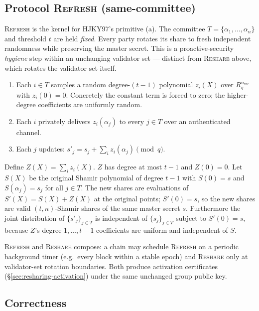 \subsection{Protocol \textsc{Refresh} (same-committee)}
\label{sec:resharing-refresh}

\textsc{Refresh} is the kernel for HJKY97's primitive (a). The committee $T = \{\alpha_1, \dots, \alpha_n\}$ and threshold $t$ are held \emph{fixed}. Every party rotates its share to fresh independent randomness while preserving the master secret. This is a proactive-security \emph{hygiene} step within an unchanging validator set --- distinct from \textsc{Reshare} above, which rotates the validator set itself.

\begin{enumerate}
\item Each $i \in T$ samples a random degree-$(t-1)$ polynomial $z_i(X)$ over $R_q^{n_{\textrm{vec}}}$ with $z_i(0) = 0$. Concretely the constant term is forced to zero; the higher-degree coefficients are uniformly random.
\item Each $i$ privately delivers $z_i(\alpha_j)$ to every $j \in T$ over an authenticated channel.
\item Each $j$ updates: $s'_j = s_j + \sum_i z_i(\alpha_j) \pmod q$.
\end{enumerate}

\begin{theorem}
Define $Z(X) = \sum_i z_i(X)$. $Z$ has degree at most $t-1$ and $Z(0) = 0$. Let $S(X)$ be the original Shamir polynomial of degree $t-1$ with $S(0) = s$ and $S(\alpha_j) = s_j$ for all $j \in T$. The new shares are evaluations of $S'(X) = S(X) + Z(X)$ at the original points; $S'(0) = s$, so the new shares are valid $(t, n)$-Shamir shares of the same master secret $s$. Furthermore the joint distribution of $\{s'_j\}_{j \in T}$ is independent of $\{s_j\}_{j \in T}$ subject to $S'(0) = s$, because $Z$'s degree-$1, \dots, t-1$ coefficients are uniform and independent of $S$.
\end{theorem}

\textsc{Refresh} and \textsc{Reshare} compose: a chain may schedule \textsc{Refresh} on a periodic background timer (e.g.\ every block within a stable epoch) and \textsc{Reshare} only at validator-set rotation boundaries. Both produce activation certificates (\S\ref{sec:resharing-activation}) under the same unchanged group public key.

\subsection{Correctness}

